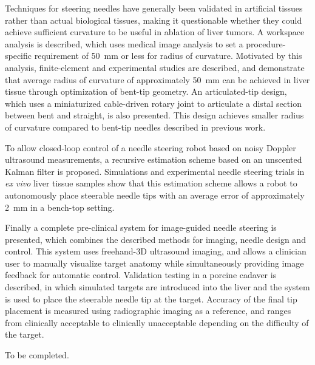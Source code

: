 \documentclass[12pt,twoside]{report}
\begin{document}
Techniques for steering needles have generally been validated in artificial tissues rather than actual biological tissues, making it questionable whether they could achieve sufficient curvature to be useful in ablation of liver tumors. A workspace analysis is described, which uses medical image analysis to set a procedure-specific requirement of 50~mm or less for radius of curvature. Motivated by this analysis, finite-element and experimental studies are described, and demonstrate that average radius of curvature of approximately 50~mm can be achieved in liver tissue through optimization of bent-tip geometry. An articulated-tip design, which uses a miniaturized cable-driven rotary joint to articulate a distal section between bent and straight, is also presented. This design achieves smaller radius of curvature compared to bent-tip needles described in previous work.

To allow closed-loop control of a needle steering robot based on noisy Doppler ultrasound measurements, a recursive estimation scheme based on an unscented Kalman filter is proposed. Simulations and experimental needle steering trials in \textit{ex vivo} liver tissue samples show that this estimation scheme allows a robot to autonomously place steerable needle tips with an average error of approximately 2~mm in a bench-top setting.

Finally a complete pre-clinical system for image-guided needle steering is presented, which combines the described methods for imaging, needle design and control. This system uses freehand-3D ultrasound imaging, and allows a clinician user to manually visualize target anatomy while simultaneously providing image feedback for automatic control. Validation testing in a porcine cadaver is described, in which simulated targets are introduced into the liver and the system is used to place the steerable needle tip at the target. Accuracy of the final tip placement is measured using radiographic imaging as a reference, and ranges from clinically acceptable to clinically unacceptable depending on the difficulty of the target. 


To be completed.

\tableofcontents
\end{document}
